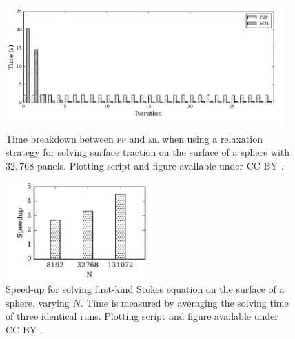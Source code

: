 \documentclass[final,3p,times]{elsarticle}
\newcommand{\mtol}{\textsc{m}\texttwooldstyle\textsc{l}\xspace} %
\newcommand{\ptop}{\textsc{p}\texttwooldstyle\textsc{p}\xspace} %
\begin{document}
\begin{figure}%
\begin{center}
	\includegraphics[natwidth=9in,natheight=4in,width=0.95\textwidth]{StokesSolveBreakdown.pdf}
	\caption{Time breakdown between {\ptop} and {\mtol} when using a relaxation strategy for solving surface traction on the surface of a sphere with $32,768$ panels. Plotting script and figure available under CC-BY \cite{WangLaytonBarba2016-figshare3}.}
	\label{fig:stokes_relaxation_breakdown}
\end{center}
\end{figure}


\begin{figure}%
\begin{center}
	\includegraphics[natwidth=3in,natheight=2in,width=0.5\textwidth]{StokesSpeedupRelaxation.pdf}
	\caption{Speed-up for solving first-kind Stokes equation on the surface of a sphere, varying $N$. Time is measured by averaging the solving time of three identical runs. Plotting script and figure available under CC-BY \cite{WangLaytonBarba2016-figshare3}.}
	\label{fig:stokes_speedup}
\end{center}
\end{figure}
\end{document}
